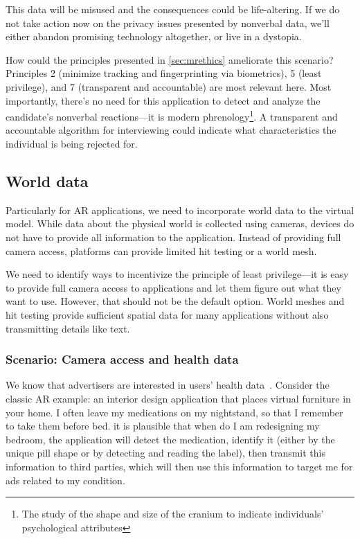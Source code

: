 This data will be misused and the consequences could be life-altering. If we do not take action now on the privacy issues presented by nonverbal data, we'll either abandon promising technology altogether, or live in a dystopia.

How could the principles presented in \autoref{sec:mrethics} ameliorate this scenario? Principles 2 (minimize tracking and fingerprinting via biometrics), 5 (least privilege), and 7 (transparent and accountable) are most relevant here. Most importantly, there's no need for this application to detect and analyze the candidate's nonverbal reactions---it is modern phrenology\footnote{The study of the shape and size of the cranium to indicate individuals' psychological attributes}. A transparent and accountable algorithm for interviewing could indicate what characteristics the individual is being rejected for.


\subsection{World data}

Particularly for AR applications, we need to incorporate world data to the virtual model. While data about the physical world is collected using cameras, devices do not have to provide all information to the application. Instead of providing full camera access, platforms can provide limited hit testing or a world mesh.

We need to identify ways to incentivize the principle of least privilege---it is easy to provide full camera access to applications and let them figure out what they want to use. However, that should not be the default option. World meshes and hit testing provide sufficient spatial data for many applications without also transmitting details like text.

\subsubsection{Scenario: Camera access and health data}\label{sec:data:world:camera}

We know that advertisers are interested in users' health data~\cite{jeong2019insurers}. Consider the classic AR example: an interior design application that places virtual furniture in your home. I often leave my medications on my nightstand, so that I remember to take them before bed. it is plausible that when do I am redesigning my bedroom, the application will detect the medication, identify it (either by the unique pill shape or by detecting and reading the label), then transmit this information to third parties, which will then use this information to target me for ads related to my condition.

